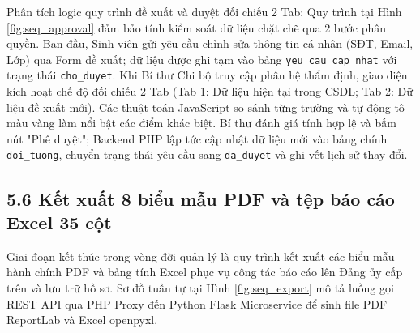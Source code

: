 \documentclass[12pt,a4paper]{report}
\begin{document}
Phân tích logic quy trình đề xuất và duyệt đối chiếu 2 Tab: Quy trình tại Hình \ref{fig:seq_approval} đảm bảo tính kiểm soát dữ liệu chặt chẽ qua 2 bước phân quyền. Ban đầu, Sinh viên gửi yêu cầu chỉnh sửa thông tin cá nhân (SĐT, Email, Lớp) qua Form đề xuất; dữ liệu được ghi tạm vào bảng \texttt{yeu\_cau\_cap\_nhat} với trạng thái \texttt{cho\_duyet}. Khi Bí thư Chi bộ truy cập phân hệ thẩm định, giao diện kích hoạt chế độ đối chiếu 2 Tab (Tab 1: Dữ liệu hiện tại trong CSDL; Tab 2: Dữ liệu đề xuất mới). Các thuật toán JavaScript so sánh từng trường và tự động tô màu vàng làm nổi bật các điểm khác biệt. Bí thư đánh giá tính hợp lệ và bấm nút "Phê duyệt"; Backend PHP lập tức cập nhật dữ liệu mới vào bảng chính \texttt{doi\_tuong}, chuyển trạng thái yêu cầu sang \texttt{da\_duyet} và ghi vết lịch sử thay đổi.

\subsection*{5.6 Kết xuất 8 biểu mẫu PDF và tệp báo cáo Excel 35 cột}
Giai đoạn kết thúc trong vòng đời quản lý là quy trình kết xuất các biểu mẫu hành chính PDF và bảng tính Excel phục vụ công tác báo cáo lên Đảng ủy cấp trên và lưu trữ hồ sơ. Sơ đồ tuần tự tại Hình \ref{fig:seq_export} mô tả luồng gọi REST API qua PHP Proxy đến Python Flask Microservice để sinh file PDF ReportLab và Excel openpyxl.
\end{document}
